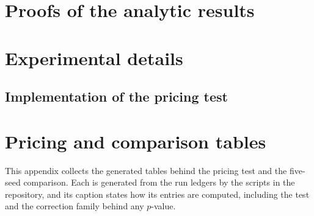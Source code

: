 %

\renewcommand{\floatpagefraction}{0.70}

\section{Proofs of the analytic results}\label{app:theory}

\FloatBarrier
\section{Experimental details}\label{app:setup}

\subsection{Implementation of the pricing test}

\FloatBarrier
\section{Pricing and comparison tables}\label{app:tables}
This appendix collects the generated tables behind the pricing test and the
five-seed comparison. Each is generated from the run ledgers by the scripts in
the repository, and its caption states how its entries are computed,
including the test and the correction family behind any $p$-value.

